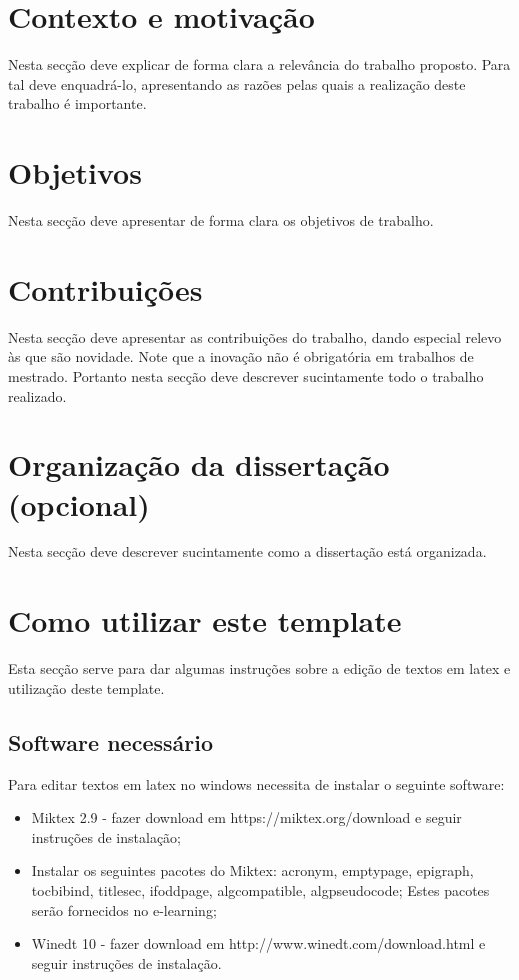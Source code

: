 \section{Contexto e motivação}
Nesta secção deve explicar de forma clara a relevância do trabalho proposto. Para tal deve enquadrá-lo, apresentando as razões pelas quais a realização deste trabalho é importante.

\section{Objetivos}
Nesta secção deve apresentar de forma clara os objetivos de trabalho.

\section{Contribuições}
Nesta secção deve apresentar as contribuições do trabalho, dando especial relevo às que são novidade. Note que a inovação não é obrigatória em trabalhos de mestrado. Portanto nesta secção deve descrever sucintamente todo o trabalho realizado.

\section{Organização da dissertação (opcional)}
Nesta secção deve descrever sucintamente como a dissertação está organizada.

\section{Como utilizar este template}
Esta secção serve para dar algumas instruções sobre a edição de textos em latex e utilização deste template.

\subsection{Software necessário}
Para editar textos em latex no windows necessita de instalar o seguinte software:
\begin{itemize}
  \item Miktex 2.9 - fazer download em https://miktex.org/download e seguir instruções de instalação;
  \item Instalar os seguintes pacotes do Miktex: acronym, emptypage, epigraph, tocbibind, titlesec, ifoddpage, algcompatible, algpseudocode; Estes pacotes serão fornecidos no e-learning;
  \item Winedt 10 - fazer download em http://www.winedt.com/download.html e seguir instruções de instalação.
\end{itemize}

